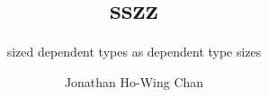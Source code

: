 \documentclass[oneside,onehalfspacing,11pt]{ubcdiss}
\title{sszz}
\subtitle{sized dependent types as dependent type sizes}
\author{Jonathan Ho\hspace{0.1em}-\hspace{-0.1em}Wing Chan}
\begin{document}
\maketitle
\makecommitteepage
\textspacing





\tableofcontents
\listoftables
\listoffigures





\mainmatter
\setcounter{chapter}{-1}








\begin{singlespace}
\raggedright

\end{singlespace}

\appendix


\backmatter
\printindex
\end{document}

